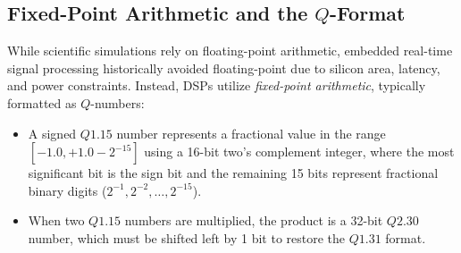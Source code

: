 \subsection{Fixed-Point Arithmetic and the $Q$-Format}
While scientific simulations rely on floating-point arithmetic, embedded real-time signal processing historically avoided floating-point due to silicon area, latency, and power constraints. Instead, DSPs utilize \textit{fixed-point arithmetic}, typically formatted as $Q$-numbers:
\begin{itemize}
    \item A signed $Q1.15$ number represents a fractional value in the range $[-1.0, +1.0 - 2^{-15}]$ using a 16-bit two's complement integer, where the most significant bit is the sign bit and the remaining 15 bits represent fractional binary digits ($2^{-1}, 2^{-2}, \dots, 2^{-15}$).
    \item When two $Q1.15$ numbers are multiplied, the product is a 32-bit $Q2.30$ number, which must be shifted left by 1 bit to restore the $Q1.31$ format.
\end{itemize}

